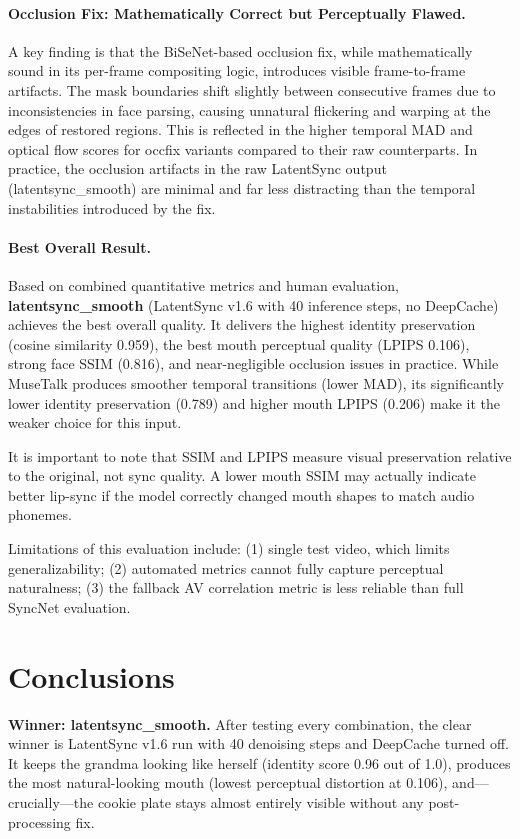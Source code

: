 \documentclass[11pt,a4paper]{article}
\begin{document}
\paragraph{Occlusion Fix: Mathematically Correct but Perceptually Flawed.}
A key finding is that the BiSeNet-based occlusion fix, while mathematically
sound in its per-frame compositing logic, introduces visible frame-to-frame
artifacts. The mask boundaries shift slightly between consecutive frames due
to inconsistencies in face parsing, causing unnatural flickering and warping
at the edges of restored regions. This is reflected in the higher temporal
MAD and optical flow scores for occfix variants compared to their raw
counterparts. In practice, the occlusion artifacts in the raw LatentSync
output (latentsync\_smooth) are minimal and far less distracting than the
temporal instabilities introduced by the fix.

\paragraph{Best Overall Result.}
Based on combined quantitative metrics and human evaluation,
\textbf{latentsync\_smooth} (LatentSync v1.6 with 40 inference steps, no
DeepCache) achieves the best overall quality. It delivers the highest
identity preservation (cosine similarity 0.959), the best mouth perceptual
quality (LPIPS 0.106), strong face SSIM (0.816), and near-negligible
occlusion issues in practice. While MuseTalk produces smoother temporal
transitions (lower MAD), its significantly lower identity preservation
(0.789) and higher mouth LPIPS (0.206) make it the weaker choice for this
input.

It is important to note that SSIM and LPIPS measure visual preservation
relative to the original, not sync quality. A lower mouth SSIM may actually
indicate better lip-sync if the model correctly changed mouth shapes to
match audio phonemes.

Limitations of this evaluation include: (1) single test video, which limits
generalizability; (2) automated metrics cannot fully capture perceptual
naturalness; (3) the fallback AV correlation metric is less reliable than
full SyncNet evaluation.


\section{Conclusions}

\noindent\textbf{Winner: latentsync\_smooth.}
After testing every combination, the clear winner is LatentSync v1.6 run
with 40 denoising steps and DeepCache turned off. It keeps the grandma
looking like herself (identity score 0.96 out of 1.0), produces the most
natural-looking mouth (lowest perceptual distortion at 0.106), and---crucially---the
cookie plate stays almost entirely visible without any post-processing fix.
\end{document}
